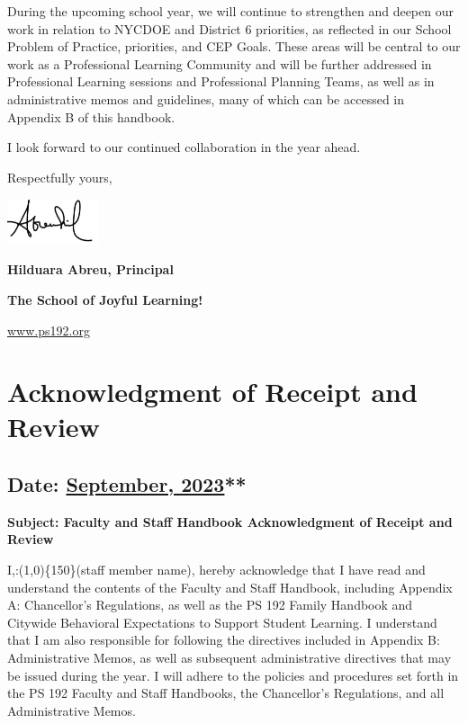 \documentclass[letterpaper, 11pt]{article}
\begin{document}
During the upcoming school year, we will continue to strengthen and deepen our work in relation to NYCDOE and District 6 priorities, as reflected in our School Problem of Practice, priorities, and CEP Goals. These areas will be central to our work as a Professional Learning Community and will be further addressed in Professional Learning sessions and Professional Planning Teams, as well as in administrative memos and guidelines, many of which can be accessed in Appendix B of this handbook.

I look forward to our continued collaboration in the year ahead.

Respectfully yours,

\includegraphics[width=0.2\textwidth]{hil_signature}

\textbf{Hilduara Abreu, Principal}

\textbf{\textbf{The School of Joyful Learning!}}

\href{https://www.ps192.org}{www.ps192.org}

\pagebreak

\section{Acknowledgment of Receipt and Review}
\label{sec:orge7244bd}
\subsection{Date: \href{https://www.ps192.org}{September, 2023}**}
\label{sec:org7d6b055}

\textbf{\textbf{Subject: Faculty and Staff Handbook Acknowledgment of Receipt and Review}}

I,:\line(1,0)\{150\}(staff member name), hereby acknowledge that I have read and understand the contents of the Faculty and Staff Handbook, including Appendix A: Chancellor’s Regulations, as well as the PS 192 Family Handbook and Citywide Behavioral Expectations to Support Student Learning. I understand that I am also responsible for following the directives included in Appendix B: Administrative Memos, as well as subsequent administrative directives that may be issued during the year. I will adhere to the policies and procedures set forth in the PS 192 Faculty and Staff Handbooks, the Chancellor’s Regulations, and all Administrative Memos.
\end{document}

